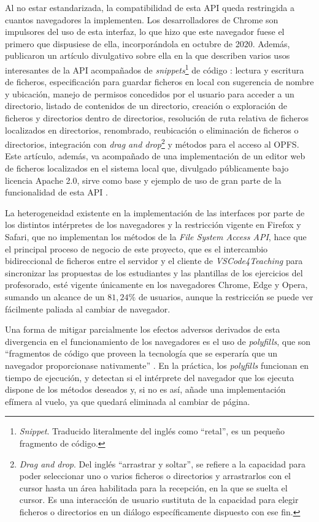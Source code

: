 Al no estar estandarizada, la compatibilidad de esta API queda restringida a cuantos navegadores la implementen. Los desarrolladores de Chrome son impulsores del uso de esta interfaz, lo que hizo que este navegador fuese el primero que dispusiese de ella, incorporándola en octubre de 2020. Además, publicaron un artículo divulgativo sobre ella en la que describen varios usos interesantes de la API acompañados de \textit{snippets}\footnote{\textit{Snippet}. Traducido literalmente del inglés como ``retal'', es un pequeño fragmento de código.} de código \cite{ArticuloChromeFsaAPI}: lectura y escritura de ficheros, especificación para guardar ficheros en local con sugerencia de nombre y ubicación, manejo de permisos concedidos por el usuario para acceder a un directorio, listado de contenidos de un directorio, creación o exploración de ficheros y directorios dentro de directorios, resolución de ruta relativa de ficheros localizados en directorios, renombrado, reubicación o eliminación de ficheros o directorios, integración con \textit{drag and drop}\footnote{\textit{Drag and drop}. Del inglés ``arrastrar y soltar'', se refiere a la capacidad para poder seleccionar uno o varios ficheros o directorios y arrastrarlos con el cursor hasta un área habilitada para la recepción, en la que se suelta el cursor. Es una interacción de usuario sustituta de la capacidad para elegir ficheros o directorios en un diálogo específicamente dispuesto con ese fin.} y métodos para el acceso al OPFS. Este artículo, además, va acompañado de una implementación de un editor web de ficheros localizados en el sistema local que, divulgado públicamente bajo licencia Apache 2.0, sirve como base y ejemplo de uso de gran parte de la funcionalidad de esta API \cite{ChromeLabsEditor}.

La heterogeneidad existente en la implementación de las interfaces por parte de los distintos intérpretes de los navegadores y la restricción vigente en Firefox y Safari, que no implementan los métodos de la \textit{File System Access API}, hace que el principal proceso de negocio de este proyecto, que es el intercambio bidireccional de ficheros entre el servidor y el cliente de \textit{VSCode4Teaching} para sincronizar las propuestas de los estudiantes y las plantillas de los ejercicios del profesorado, esté vigente únicamente en los navegadores Chrome, Edge y Opera, sumando un alcance de un $81,24\%$ de usuarios, aunque la restricción se puede ver fácilmente paliada al cambiar de navegador.

Una forma de mitigar parcialmente los efectos adversos derivados de esta divergencia en el funcionamiento de los navegadores es el uso de \textit{polyfills}, que son ``fragmentos de código que proveen la tecnología que se esperaría que un navegador proporcionase nativamente'' \cite{Polyfill}. En la práctica, los \textit{polyfills} funcionan en tiempo de ejecución, y detectan si el intérprete del navegador que los ejecuta dispone de los métodos deseados y, si no es así, añade una implementación efímera al vuelo, ya que quedará eliminada al cambiar de página.

